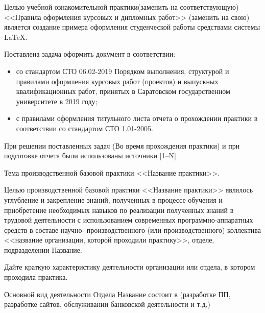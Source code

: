 \documentclass[bachelor, och, coursework]{SCWorks}
\begin{document}

Целью учебной ознакомительной практики(заменить на соответствующую) <<Правила оформления курсовых и дипломных работ>> (заменить на свою) является создание примера оформления студенческой работы средствами системы \LaTeX.

Поставлена задача оформить документ в соответствии:
\begin{itemize}
    \item со стандартом СТО 06.02-2019 Порядком выполнения, структурой и правилами оформления курсовых работ (проектов)
    и выпускных квалификационных работ, принятых в Саратовском государственном университете в 2019 году;
    \item с правилами оформления титульного листа отчета о прохождении практики в соответствии со стандартом СТО 1.01-2005.
\end{itemize}

При решении поставленных задач (Во время прохождения практики) и при подготовке отчета были использованы источники [1--N]

Тема производственной базовой практики <<Название практики>>.

Целью производственной базовой практики <<Название  практики>>  являлось углубление и закрепление знаний, полученных в процессе обучения и приобретение необходимых навыков
по реализации полученных знаний в трудовой деятельности с использованием современных программно-аппаратных средств в составе научно-
производственного (или производственного) коллектива <<название организации, которой проходили практику>>, отделе, подразделении Название.

 Дайте краткую характеристику деятельности организации или отдела, в котором проходила практика.

 Основной вид деятельности Отдела Название состоит в (разработке ПП, разработке сайтов, обслуживании банковской деятельности и т.д.)
\end{document}

